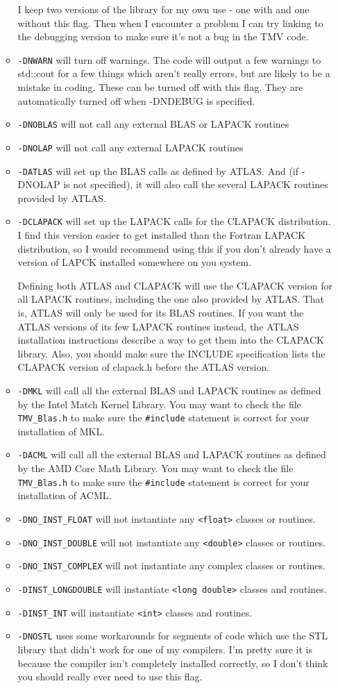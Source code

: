 \documentclass[twoside,letterpaper,11pt]{article}
\renewcommand{\tt}[1]{{\texttt {#1}}}
\begin{document}
\begin{enumerate}
\begin{itemize}
I keep two versions of the library for my own use - one with and one without 
this flag.  Then when I encounter a problem I can try linking to the debugging 
version to make sure it's not a bug in the TMV code.
\item
\tt{-DNWARN} will turn off warnings.  The code will output a few warnings to 
std::cout for a few things which aren't really errors, but are likely to be a
mistake in coding.  These can be turned off with this flag.
They are automatically turned off when -DNDEBUG is specified. 
\item
\tt{-DNOBLAS} will not call any external BLAS or LAPACK routines
\item
\tt{-DNOLAP} will not call any external LAPACK routines
\item
\tt{-DATLAS} will set up the BLAS calls as defined by ATLAS.  And (if -DNOLAP
is not specified), it will also call the several LAPACK routines
provided by ATLAS.
\item
\tt{-DCLAPACK} will set up the LAPACK calls for the CLAPACK distribution.  I 
find this version easier to get installed than the Fortran LAPACK distribution,
so I would recommend using this if you don't already have a version of LAPCK
installed somewhere on you system.  

Defining both ATLAS and CLAPACK will use
the CLAPACK version for all LAPACK routines, including the one also provided by 
ATLAS.  That is, ATLAS will only be used for its BLAS routines.  If you want
the ATLAS versions of its few LAPACK routines instead, the ATLAS 
installation instructions describe a way to get them into the CLAPACK library.
Also, you should make sure the INCLUDE specification lists the CLAPACK
version of clapack.h before the ATLAS version.
\item
\tt{-DMKL} will call all the external BLAS and LAPACK routines as defined by the
Intel Match Kernel Library.  You may want to check the file \tt{TMV\_Blas.h} to 
make sure the \tt{\#include} statement is correct for your installation of MKL.
\item
\tt{-DACML} will call all the external BLAS and LAPACK routines as defined by the 
AMD Core Math Library.  You may want to check the file \tt{TMV\_Blas.h} to make
sure the \tt{\#include} statement is correct for your installation of ACML.
\item
\tt{-DNO\_INST\_FLOAT} will not instantiate any \tt{<float>} classes or routines.
\item
\tt{-DNO\_INST\_DOUBLE} will not instantiate any \tt{<double>} classes or routines.
\item
\tt{-DNO\_INST\_COMPLEX} will not instantiate any complex classes or routines.
\item
\tt{-DINST\_LONGDOUBLE} will instantiate \tt{<long double>} classes and routines.
\item
\tt{-DINST\_INT} will instantiate \tt{<int>} classes and routines.
\item
\tt{-DNOSTL} uses some workarounds for segments of code which use the STL
library that didn't work for one of my compilers.  I'm pretty sure it is
because the compiler isn't completely installed correctly, so I don't think you
should really ever need to use this flag.  


\end{itemize}
\end{enumerate}
\end{document}
